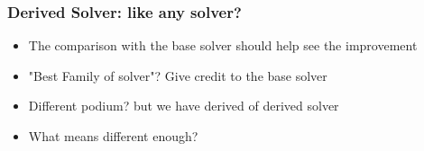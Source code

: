 \documentclass[table]{beamer}
\begin{document}
\begin{frame}
  \frametitle{Derived Solver: like any solver?}
  \begin{itemize}[<+->]
    \item The comparison with the base solver should help see the improvement
    \item "Best Family of solver"? Give credit to the base solver
    \item Different podium? but we have derived of derived solver
    \item What means different enough?
  \end{itemize}
\end{frame}

\end{document}
